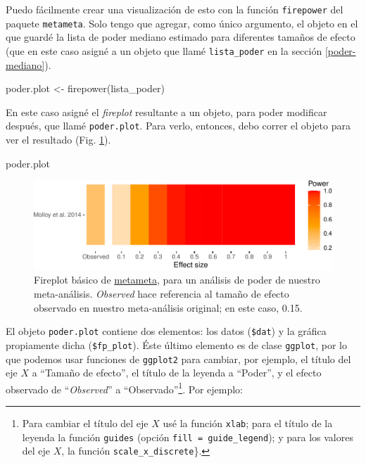 \documentclass[
  bookmarksnumbered]{article}
\newenvironment{Shaded}{\begin{snugshade}}{\end{snugshade}}
\newcommand{\FunctionTok}[1]{\textcolor[rgb]{0.39,0.29,0.61}{#1}}
\newcommand{\NormalTok}[1]{\textcolor[rgb]{0.12,0.11,0.11}{#1}}
\newcommand{\OtherTok}[1]{\textcolor[rgb]{0.00,0.43,0.16}{#1}}
\begin{document}
Puedo fácilmente crear una visualización de esto con la función \texttt{firepower} del paquete \texttt{metameta}. Solo tengo que agregar, como único argumento, el objeto en el que guardé la lista de poder mediano estimado para diferentes tamaños de efecto (que en este caso asigné a un objeto que llamé \texttt{lista\_poder} en la sección \ref{poder-mediano}).

\begin{Shaded}
\begin{Highlighting}[]
\NormalTok{poder.plot }\OtherTok{\textless{}{-}} \FunctionTok{firepower}\NormalTok{(lista\_poder)}
\end{Highlighting}
\end{Shaded}

En este caso asigné el \emph{fireplot} resultante a un objeto, para poder modificar después, que llamé \texttt{poder.plot}. Para verlo, entonces, debo correr el objeto para ver el resultado (Fig. \ref{fig:fire-plot1}).

\begin{Shaded}
\begin{Highlighting}[]
\NormalTok{poder.plot}
\end{Highlighting}
\end{Shaded}

\begin{figure}
\centering
\includegraphics{Meta-analysis_files/figure-latex/fire-plot1-1.pdf}
\caption{\label{fig:fire-plot1}Fireplot básico de \href{https://www.dsquintana.blog/metameta-r-package-meta-analysis/}{metameta}, para un análisis de poder de nuestro meta-análisis. \emph{Observed} hace referencia al tamaño de efecto observado en nuestro meta-análisis original; en este caso, 0.15.}
\end{figure}

El objeto \texttt{poder.plot} contiene dos elementos: los datos (\texttt{\$dat}) y la gráfica propiamente dicha (\texttt{\$fp\_plot}). Éste último elemento es de clase \texttt{ggplot}, por lo que podemos usar funciones de \texttt{ggplot2} para cambiar, por ejemplo, el título del eje \(X\) a ``Tamaño de efecto'', el título de la leyenda a ``Poder'', y el efecto observado de ``\emph{Observed}'' a ``Observado''\footnote{Para cambiar el título del eje \(X\) usé la función \texttt{xlab}; para el título de la leyenda la función \texttt{guides} (opción \texttt{fill\ =\ guide\_legend}); y para los valores del eje \(X\), la función \texttt{scale\_x\_discrete}\}.}. Por ejemplo:
\end{document}
